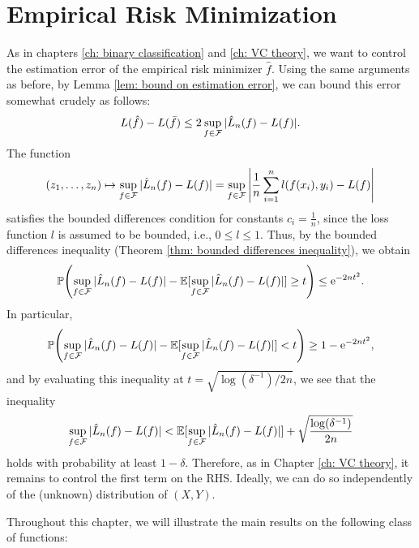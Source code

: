 \section{Empirical Risk Minimization}

As in chapters \ref{ch: binary classification} and \ref{ch: VC theory}, we want to control the estimation error of the empirical risk minimizer $\hat{f}$. Using the same arguments as before, by Lemma \ref{lem: bound on estimation error}, we can bound this error somewhat crudely as follows:
\[
    L(\hat{f}) - L(\bar{f}) \leq 2 \sup_{f \in \mathcal{F}} \abs*{\hat{L}_n(f) - L(f)}.
\]
The function
\[
    (z_1, \dots, z_n) \mapsto \sup_{f \in \mathcal{F}} \abs*{\hat{L}_n(f) - L(f)} = \sup_{f \in \mathcal{F}} \abs{\frac{1}{n} \sum_{i=1}^n l(f(x_i), y_i) - L(f)}
\]
satisfies the bounded differences condition for constants $c_i = \frac{1}{n}$, since the loss function $l$ is assumed to be bounded, i.e., $0 \leq l \leq 1$. Thus, by the bounded differences inequality (Theorem \ref{thm: bounded differences inequality}), we obtain
\[
    \Prob\left(\sup_{f \in \mathcal{F}} \abs*{\hat{L}_n(f) - L(f)} - \Exp[\sup_{f \in \mathcal{F}} \abs*{\hat L_n(f) - L(f)}] \geq t\right) \leq \e^{-2nt^2}.
\]
In particular,
\[
    \Prob\left(\sup_{f \in \mathcal{F}} \abs*{\hat{L}_n(f) - L(f)} - \Exp[\sup_{f \in \mathcal{F}} \abs*{\hat{L}_n(f) - L(f)}] < t\right) \geq 1 - \e^{-2nt^2},
\]
and by evaluating this inequality at $t = \sqrt{\log(\delta^{-1}) / 2n}$, we see that the inequality
\[
    \sup_{f \in \mathcal{F}} \abs*{\hat{L}_n(f) - L(f)} < \Exp[\sup_{f \in \mathcal{F}} \abs*{\hat L_n(f) - L(f)}] + \sqrt{\frac{\log(\delta^{-1})}{2n}}
\]
holds with probability at least $1 - \delta$. Therefore, as in Chapter \ref{ch: VC theory}, it remains to control the first term on the RHS. Ideally, we can do so independently of the (unknown) distribution of $(X, Y)$.

Throughout this chapter, we will illustrate the main results on the following class of functions:


